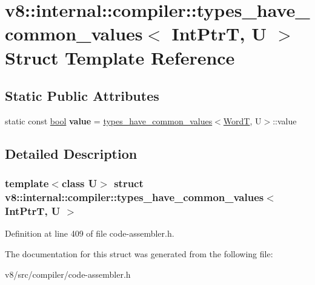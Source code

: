 \hypertarget{structv8_1_1internal_1_1compiler_1_1types__have__common__values_3_01IntPtrT_00_01U_01_4}{}\section{v8\+:\+:internal\+:\+:compiler\+:\+:types\+\_\+have\+\_\+common\+\_\+values$<$ Int\+PtrT, U $>$ Struct Template Reference}
\label{structv8_1_1internal_1_1compiler_1_1types__have__common__values_3_01IntPtrT_00_01U_01_4}
\subsection*{Static Public Attributes}
\begin{DoxyCompactItemize}
\item 
\mbox{\label{structv8_1_1internal_1_1compiler_1_1types__have__common__values_3_01IntPtrT_00_01U_01_4_aa09bae88469e0d9ed7804daf6948ca26}} 
static const \mbox{\hyperlink{classbool}{bool}} {\bfseries value} = \mbox{\hyperlink{structv8_1_1internal_1_1compiler_1_1types__have__common__values}{types\+\_\+have\+\_\+common\+\_\+values}}$<$\mbox{\hyperlink{structv8_1_1internal_1_1WordT}{WordT}}, U$>$\+::value
\end{DoxyCompactItemize}


\subsection{Detailed Description}
\subsubsection*{template$<$class U$>$\newline
struct v8\+::internal\+::compiler\+::types\+\_\+have\+\_\+common\+\_\+values$<$ Int\+Ptr\+T, U $>$}



Definition at line 409 of file code-\/assembler.\+h.



The documentation for this struct was generated from the following file\+:\begin{DoxyCompactItemize}
\item 
v8/src/compiler/code-\/assembler.\+h\end{DoxyCompactItemize}
